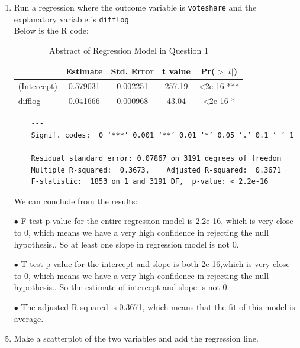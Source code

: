 \documentclass[12pt,letterpaper]{article}
\begin{document}
	\begin{enumerate}
		\item Run a regression where the outcome variable is \texttt{voteshare} and the explanatory variable is \texttt{difflog}. \\

		Below is the R code:
		
		
	\begin{table}[ht]
	\centering
	\caption{Abstract of Regression Model in Question 1}
		\begin{tabular}{lcccc}
			\toprule
			& Estimate & Std. Error & t value & Pr($>|t|$) \\
			\midrule
			(Intercept) & 0.579031 &0.002251 & 257.19 & <2e-16 *** \\
			difflog & 0.041666 & 0.000968 & 43.04 & <2e-16 * \\
			\bottomrule
		\end{tabular} 
	\end{table}
	\begin{verbatim}
	---
	Signif. codes:  0 ‘***’ 0.001 ‘**’ 0.01 ‘*’ 0.05 ‘.’ 0.1 ‘ ’ 1
	
	Residual standard error: 0.07867 on 3191 degrees of freedom
	Multiple R-squared:  0.3673,	Adjusted R-squared:  0.3671 
	F-statistic:  1853 on 1 and 3191 DF,  p-value: < 2.2e-16
	\end{verbatim}
		We can conclude from the results:
			\item[$\bullet$] F test p-value for the entire regression model is 2.2e-16, which is very close to 0, which means we have a very high confidence in rejecting the null hypothesis.. So at least one slope in regression model is not 0.
			\item[$\bullet$] T test p-value for the intercept and slope is both 2e-16,which is very close to 0, which means we have a very high confidence in rejecting the null hypothesis.. So the estimate of intercept and slope is not 0.
			 \item[$\bullet$] The adjusted R-squared is 0.3671, which means that the fit of this model is average.
		
		\newpage
		
		\item Make a scatterplot of the two variables and add the regression line. \\
		

\end{enumerate}
\end{document}
